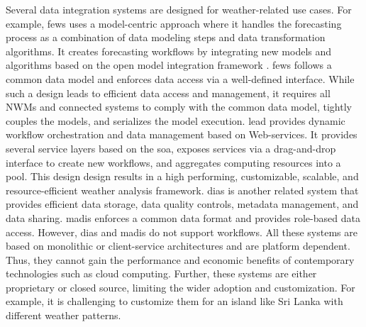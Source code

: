 \documentclass[conference]{IEEEtran}
\begin{document}
Several data integration systems are designed for weather-related use cases. For example, \acrshort{fews} \cite{Werner2013TheSystem} uses a model-centric approach where it handles the forecasting process as a combination of data modeling steps and data transformation algorithms. It creates forecasting workflows by integrating new models and algorithms based on the open model integration framework \cite{Kokkonen2003InterfacingXML}. \acrshort{fews} follows a common data model and enforces data access via a well-defined interface. While such a design leads to efficient data access and management, it requires all NWMs and connected systems to comply with the common data model, tightly couples the models, and serializes the model execution. 
\acrfull{lead} \cite{Droegemeier2005Service-OrientedWeather} provides dynamic workflow orchestration and data management based on Web-services. It provides several service layers based on the \acrfull{soa}, exposes services via a drag-and-drop interface to create new workflows, and aggregates computing resources into a pool. This design design results in a high performing, customizable, scalable, and resource-efficient weather analysis framework. 
\acrfull{dias} \cite{Kawasaki2018DataReduction} is another related system that provides efficient data storage, data quality controls, metadata management, and data sharing. \acrfull{madis} \cite{Macdermaid2005ArchitectureP2.39} enforces a common data format and provides role-based data access. 
However, \acrshort{dias} and \acrshort{madis} do not support workflows. All these systems are based on monolithic or client-service architectures and are platform dependent. Thus, they cannot gain the performance and economic benefits of contemporary technologies such as cloud computing. Further, these systems are either proprietary or closed source, limiting the wider adoption and customization. For example, it is challenging to customize them for an island like Sri Lanka with different weather patterns.

\end{document}
